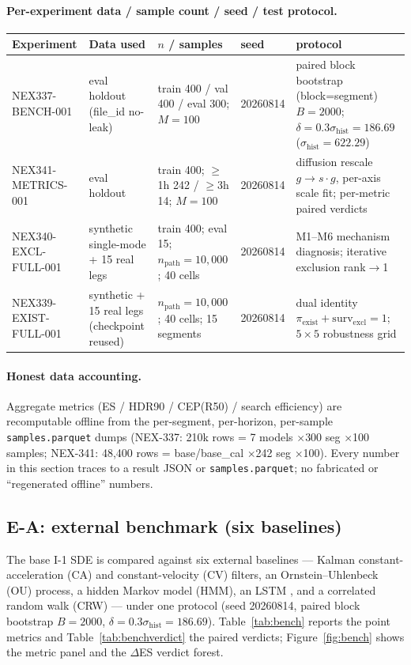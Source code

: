 \documentclass[11pt]{article}
\begin{document}
\paragraph{Per-experiment data / sample count / seed / test protocol.}
\begin{center}
\small
\begin{tabular}{p{2.9cm}p{4.4cm}p{2.6cm}p{1.6cm}p{1.2cm}}
\toprule
Experiment & Data used & $n$ / samples & seed & protocol \\
\midrule
NEX337-BENCH-001 & eval holdout (file\_id no-leak) & train 400 / val 400 / eval 300; $M{=}100$ & 20260814 & paired block bootstrap (block=segment) $B{=}2000$; $\delta{=}0.3\sigma_{\mathrm{hist}}{=}186.69$ ($\sigma_{\mathrm{hist}}{=}622.29$) \\
NEX341-METRICS-001 & eval holdout & train 400; $\ge$1h 242 / $\ge$3h 14; $M{=}100$ & 20260814 & diffusion rescale $g{\to}s{\cdot}g$, per-axis scale fit; per-metric paired verdicts \\
NEX340-EXCL-FULL-001 & synthetic single-mode + 15 real legs & train 400; eval 15; $n_{\mathrm{path}}{=}10{,}000$; 40 cells & 20260814 & M1--M6 mechanism diagnosis; iterative exclusion rank$\to$1 \\
NEX339-EXIST-FULL-001 & synthetic + 15 real legs (checkpoint reused) & $n_{\mathrm{path}}{=}10{,}000$; 40 cells; 15 segments & 20260814 & dual identity $\pi_{\mathrm{exist}}{+}\mathrm{surv}_{\mathrm{excl}}{=}1$; $5{\times}5$ robustness grid \\
\bottomrule
\end{tabular}
\end{center}

\paragraph{Honest data accounting.}
Aggregate metrics (ES / HDR90 / CEP(R50) / search efficiency) are
recomputable offline from the per-segment, per-horizon, per-sample
\texttt{samples.parquet} dumps (NEX-337: 210k rows = 7 models $\times$300
seg $\times$100 samples; NEX-341: 48{,}400 rows = base/base\_cal $\times$242
seg $\times$100).  Every number in this section traces to a result JSON or
\texttt{samples.parquet}; no fabricated or ``regenerated offline'' numbers.

\subsection{E-A: external benchmark (six baselines)}
\label{sec:exp-a}
The base I-1 SDE is compared against six external baselines --- Kalman
constant-acceleration (CA) and constant-velocity (CV) filters, an
Ornstein--Uhlenbeck (OU) process, a hidden Markov model (HMM), an LSTM
\cite{hochreiter1997}, and a correlated random walk (CRW) --- under one
protocol (seed 20260814, paired block bootstrap $B{=}2000$,
$\delta{=}0.3\sigma_{\mathrm{hist}}{=}186.69$). Table~\ref{tab:bench} reports
the point metrics and Table~\ref{tab:benchverdict} the paired verdicts;
Figure~\ref{fig:bench} shows the metric panel and the $\Delta$ES verdict
forest.
\end{document}
